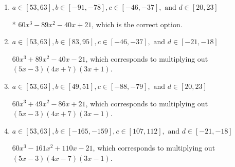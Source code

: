 \documentclass{extbook}[14pt]
\begin{document}
\begin{enumerate}
{\begin{enumerate}[label=\Alph*.]
$60x^{3} -89 x^{2} -40 x -21$, which corresponds to multiplying everything correctly except the constant term.
\item \( a \in [53, 63], b \in [-91, -78], c \in [-46, -37], \text{ and } d \in [20, 23] \)

* $60x^{3} -89 x^{2} -40 x + 21$, which is the correct option.
\item \( a \in [53, 63], b \in [83, 95], c \in [-46, -37], \text{ and } d \in [-21, -18] \)

$60x^{3} +89 x^{2} -40 x -21$, which corresponds to multiplying out $(5x -3)(4x + 7)(3x + 1)$.
\item \( a \in [53, 63], b \in [49, 51], c \in [-88, -79], \text{ and } d \in [20, 23] \)

$60x^{3} +49 x^{2} -86 x + 21$, which corresponds to multiplying out $(5x -3)(4x + 7)(3x -1)$.
\item \( a \in [53, 63], b \in [-165, -159], c \in [107, 112], \text{ and } d \in [-21, -18] \)

$60x^{3} -161 x^{2} +110 x -21$, which corresponds to multiplying out $(5x -3)(4x -7)(3x -1)$.
\end{enumerate}

}
\end{enumerate}
\end{document}
